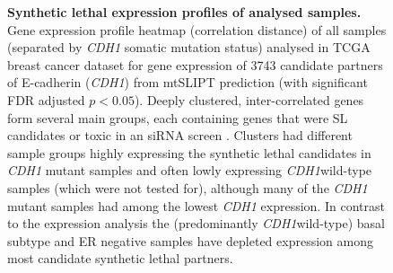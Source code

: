 \begin{figure}[!ht]
  \centering
    \caption[Synthetic lethal expression profiles of analysed samples]{\small \textbf{Synthetic lethal expression profiles of analysed samples.} Gene expression profile heatmap (correlation distance) of all samples (separated by \textit{CDH1} somatic mutation status) analysed in \gls{TCGA} breast cancer dataset for gene expression of 3743 candidate partners of \gls{E-cadherin} (\textit{CDH1}) from \acrshort{mtSLIPT} prediction (with significant \gls{FDR} adjusted $p < 0.05$). Deeply clustered, inter-correlated genes form several main groups, each containing genes that were SL candidates or toxic in an \gls{siRNA} screen \cite{Telford2015}. Clusters had different sample groups highly expressing the synthetic lethal candidates in \textit{CDH1} mutant samples and often lowly expressing \textit{CDH1}\gls{wild-type} samples (which were not tested for), although many of the \textit{CDH1} mutant samples had among the lowest \textit{CDH1} expression. In contrast to the expression analysis the (predominantly \textit{CDH1}\gls{wild-type}) basal subtype and \acrshort{ER} negative samples have depleted expression among most candidate synthetic lethal partners. 
}
\label{fig:slipt_expr_mtSL}
\end{figure}

